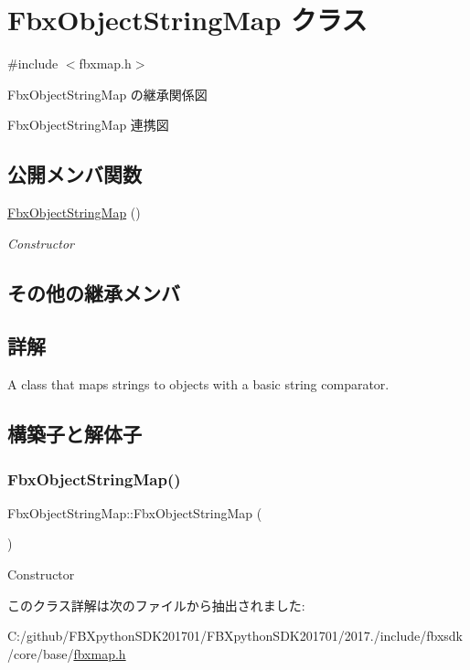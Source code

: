 \hypertarget{class_fbx_object_string_map}{}\section{Fbx\+Object\+String\+Map クラス}
\label{class_fbx_object_string_map}


{\ttfamily \#include $<$fbxmap.\+h$>$}



Fbx\+Object\+String\+Map の継承関係図


Fbx\+Object\+String\+Map 連携図
\subsection*{公開メンバ関数}
\begin{DoxyCompactItemize}
\item 
\hyperlink{class_fbx_object_string_map_a6a4b36100241a2c021254bb1d8edb332}{Fbx\+Object\+String\+Map} ()
\begin{DoxyCompactList}\small\item\em Constructor \end{DoxyCompactList}\end{DoxyCompactItemize}
\subsection*{その他の継承メンバ}


\subsection{詳解}
A class that maps strings to objects with a basic string comparator. 

\subsection{構築子と解体子}
\mbox{\label{class_fbx_object_string_map_a6a4b36100241a2c021254bb1d8edb332}} 
\subsubsection{\texorpdfstring{Fbx\+Object\+String\+Map()}{FbxObjectStringMap()}}
{\footnotesize\ttfamily Fbx\+Object\+String\+Map\+::\+Fbx\+Object\+String\+Map (\begin{DoxyParamCaption}{ }\end{DoxyParamCaption})}



Constructor 



このクラス詳解は次のファイルから抽出されました\+:\begin{DoxyCompactItemize}
\item 
C\+:/github/\+F\+B\+Xpython\+S\+D\+K201701/\+F\+B\+Xpython\+S\+D\+K201701/2017./include/fbxsdk/core/base/\hyperlink{fbxmap_8h}{fbxmap.\+h}\end{DoxyCompactItemize}
